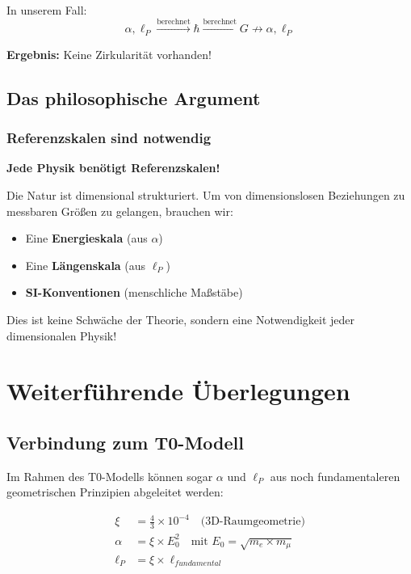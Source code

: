 	In unserem Fall:
	\begin{equation}
		\alpha, \ell_P \xrightarrow{\text{berechnet}} \hbar \xrightarrow{\text{berechnet}} G \not\rightarrow \alpha, \ell_P
	\end{equation}
	
	\textbf{Ergebnis:} Keine Zirkularität vorhanden!
	
	\subsection{Das philosophische Argument}
	
	\subsubsection{Referenzskalen sind notwendig}
	
	\begin{tcolorbox}[colback=blue!5!white,colframe=blue!75!black,title=Fundamentale Erkenntnis]
		\textbf{Jede Physik benötigt Referenzskalen!}
		
		Die Natur ist dimensional strukturiert. Um von dimensionslosen Beziehungen zu messbaren Größ{}en zu gelangen, brauchen wir:
		\begin{itemize}
			\item Eine \textbf{Energieskala} (aus $\alpha$)
			\item Eine \textbf{Längenskala} (aus $\ell_P$) 
			\item \textbf{SI-Konventionen} (menschliche Maß{}stäbe)
		\end{itemize}
		
		Dies ist keine Schwäche der Theorie, sondern eine Notwendigkeit jeder dimensionalen Physik!
	\end{tcolorbox}
	
	\section{Weiterführende Überlegungen}
	
	\subsection{Verbindung zum T0-Modell}
	
	Im Rahmen des T0-Modells können sogar $\alpha$ und $\ell_P$ aus noch fundamentaleren geometrischen Prinzipien abgeleitet werden:
	
	\begin{align}
		\xi &= \frac{4}{3} \times 10^{-4} \quad \text{(3D-Raumgeometrie)}\\
		\alpha &= \xi \times E_0^2 \quad \text{mit } E_0 = \sqrt{m_e \times m_\mu}\\
		\ell_P &= \xi \times \ell_{fundamental}
	\end{align}
	
